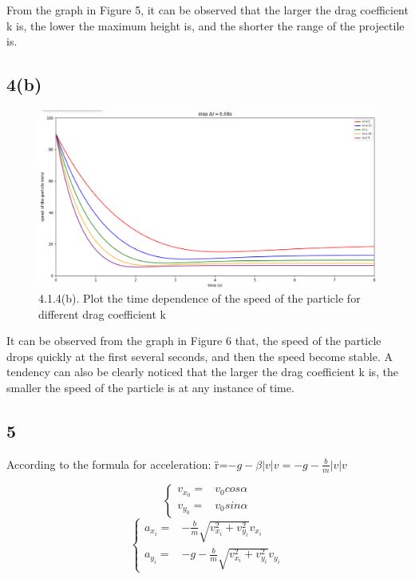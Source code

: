 \documentclass{article}
\begin{document}
From the graph in Figure 5, it can be observed that the larger the drag coefficient k is, the lower the maximum height is, and the shorter the range of the projectile is.

\subsection*{4(b)}

\begin{figure}[H]
  \centering
  \includegraphics[scale=0.4]{./graphs/project4.1.4(b).png}
  \caption{4.1.4(b). Plot the time dependence of the speed of the particle for different drag coefficient k}
\end{figure}

It can be observed from the graph in Figure 6 that, the speed of the particle drops quickly at the first several seconds, and then the speed become stable.
A tendency can also be clearly noticed that the larger the drag coefficient k is, the smaller the speed of the particle is at any instance of time.

\vspace{0.01\textheight}
\subsection*{5}
According to the formula for acceleration: {\"r}=$-g-\beta |v|v=-g-\frac{b}{m}|v|v$

$$
\begin{cases}
    v_{x_{0}}= & v_{0}cos\alpha \\

    v_{y_{0}}= & v_{0}sin\alpha
  \end{cases}
$$
$$
  \begin{cases}
    a_{x_{i}}= & -\frac{b}{m} \sqrt{v_{x_{i}}^{2}+v_{y_{i}}^{2}}v_{x_{i}}   \\

    a_{y_{i}}= & -g-\frac{b}{m} \sqrt{v_{x_{i}}^{2}+v_{y_{i}}^{2}}v_{y_{i}}
  \end{cases}
$$
\end{document}
